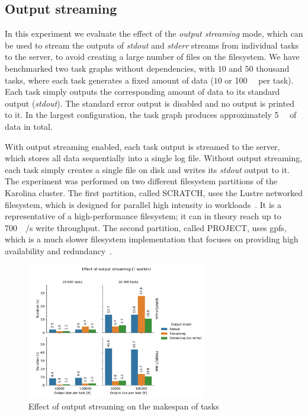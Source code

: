\subsection{Output streaming}
\label{sec:hq-exp-output-streaming}
In this experiment we evaluate the effect of the \emph{output streaming} mode, which can be used to
stream the outputs of \emph{stdout} and \emph{stderr} streams from individual
tasks to the \hyperqueue{} server, to avoid creating a large number of files on the
filesystem. We have benchmarked two task graphs without dependencies, with $10$
and $50$ thousand tasks, where each task generates a fixed amount of data
($10$ or \SI{100}{\kibi\byte} per task). Each task simply outputs the
corresponding amount of data to its standard output (\emph{stdout}). The standard error
output is disabled and no output is printed to it. In the largest configuration, the task graph
produces approximately \SI{5}{\gibi\byte} of data in total.

With output streaming enabled, each task output is streamed to the server, which stores all data
sequentially into a single log file. Without output streaming, each task simply creates a single
file on disk and writes its \emph{stdout} output to it. The experiment was performed on
two different filesystem partitions of the Karolina cluster. The first partition, called SCRATCH,
uses the Lustre networked filesystem, which is designed for parallel high intensity
\gls{io} workloads~\cite{karolina_scratch}. It is a representative of a
high-performance filesystem; it can in theory reach up to \SI{700}{\gibi\byte}/s write
throughput. The second partition, called PROJECT, uses \gls{gpfs}, which is a much
slower filesystem implementation that focuses on providing high availability and
redundancy~\cite{karolina_project}.

\begin{figure}[h]
	\centering
	\includegraphics[width=0.7\textwidth]{imgs/hq/charts/io-streaming}
	\caption{Effect of output streaming on the makespan of tasks}
	\label{fig:hq-io-streaming}
\end{figure}

